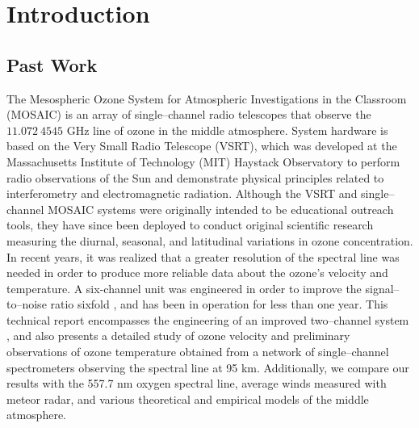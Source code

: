 \documentclass[11pt]{article}
\begin{document}
\section{Introduction}
\subsection{Past Work}
The Mesospheric Ozone System for Atmospheric Investigations in the Classroom (MOSAIC) is an array of single--channel radio telescopes that observe the $11.072~4545$ GHz line of ozone in the middle atmosphere. System hardware is based on the Very Small Radio Telescope (VSRT), which was developed at the Massachusetts Institute of Technology (MIT) Haystack Observatory to perform radio observations of the Sun and demonstrate physical principles related to interferometry and electromagnetic radiation. Although the VSRT and single--channel MOSAIC systems were originally intended to be educational outreach tools, they have since been deployed to conduct original scientific research \cite{Rogers2009}\cite{Rogers2012} measuring the diurnal, seasonal, and latitudinal variations in ozone concentration. In recent years, it was realized that a greater resolution of the spectral line was needed in order to produce more reliable data about the ozone's velocity and temperature. A six-channel unit was engineered in order to improve the signal--to--noise ratio sixfold \cite{True2014}, and has been in operation for less than one year. This technical report encompasses the engineering of an improved two--channel system \cite{VSRT77}, and also presents a detailed study of ozone velocity and preliminary observations of ozone temperature obtained from a network of single--channel spectrometers observing the spectral line at 95 km. Additionally, we compare our results with the 557.7 nm oxygen spectral line, average winds measured with meteor radar, and various theoretical and empirical models of the middle atmosphere.

\end{document}
